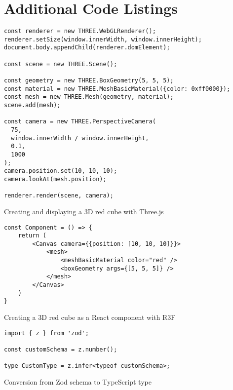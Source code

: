 \chapter{Additional Code Listings} 

\begin{listing}
\begin{verbatim}
const renderer = new THREE.WebGLRenderer();
renderer.setSize(window.innerWidth, window.innerHeight);
document.body.appendChild(renderer.domElement);

const scene = new THREE.Scene();

const geometry = new THREE.BoxGeometry(5, 5, 5);
const material = new THREE.MeshBasicMaterial({color: 0xff0000});
const mesh = new THREE.Mesh(geometry, material);
scene.add(mesh);

const camera = new THREE.PerspectiveCamera(
  75,
  window.innerWidth / window.innerHeight,
  0.1,
  1000
);
camera.position.set(10, 10, 10);
camera.lookAt(mesh.position);

renderer.render(scene, camera);
\end{verbatim}
\caption{Creating and displaying a 3D red cube with Three.js}
\label{listing:threejs}
\end{listing}

\begin{listing}
\begin{verbatim}
const Component = () => {
    return (
        <Canvas camera={{position: [10, 10, 10]}}>
            <mesh>
                <meshBasicMaterial color="red" />
                <boxGeometry args={[5, 5, 5]} />
            </mesh>
        </Canvas>
    )
}
\end{verbatim}
\caption{Creating a 3D red cube as a React component with R3F}
\label{lisiting:r3f}
\end{listing}

\begin{listing}
\begin{verbatim}
import { z } from 'zod';

const customSchema = z.number();

type CustomType = z.infer<typeof customSchema>;
\end{verbatim}
\caption{Conversion from Zod schema to TypeScript type}
\label{listing:zod}
\end{listing}